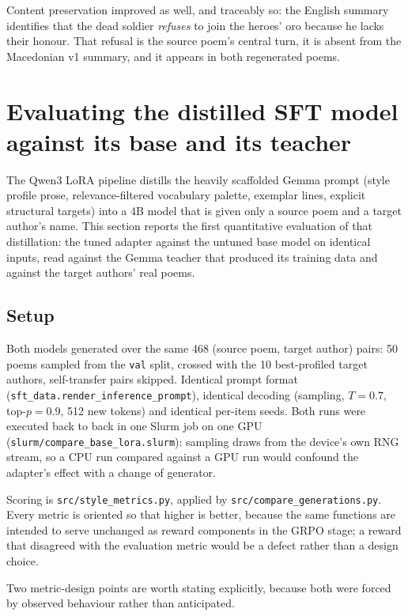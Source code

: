 \documentclass[11pt]{article}
\begin{document}
Content preservation improved as well, and traceably so: the English summary
identifies that the dead soldier \emph{refuses} to join the heroes' oro because
he lacks their honour. That refusal is the source poem's central turn, it is
absent from the Macedonian v1 summary, and it appears in both regenerated
poems.

\section{Evaluating the distilled SFT model against its base and its
teacher}\label{sec:sfteval}

The Qwen3 LoRA pipeline distills the heavily scaffolded Gemma prompt (style
profile prose, relevance-filtered vocabulary palette, exemplar lines,
explicit structural targets) into a 4B model that is given only a source poem
and a target author's name. This section reports the first quantitative
evaluation of that distillation: the tuned adapter against the untuned base
model on identical inputs, read against the Gemma teacher that produced its
training data and against the target authors' real poems.

\subsection{Setup}

Both models generated over the same 468 (source poem, target author) pairs:
50 poems sampled from the \texttt{val} split, crossed with the 10
best-profiled target authors, self-transfer pairs skipped. Identical prompt
format (\texttt{sft\_data.render\_inference\_prompt}), identical decoding
(sampling, $T=0.7$, top-$p=0.9$, 512 new tokens) and identical per-item seeds.
Both runs were executed back to back in one Slurm job on one GPU
(\texttt{slurm/compare\_base\_lora.slurm}): sampling draws from the device's
own RNG stream, so a CPU run compared against a GPU run would confound the
adapter's effect with a change of generator.

Scoring is \texttt{src/style\_metrics.py}, applied by
\texttt{src/compare\_generations.py}. Every metric is oriented so that higher
is better, because the same functions are intended to serve unchanged as
reward components in the GRPO stage; a reward that disagreed with the
evaluation metric would be a defect rather than a design choice.

Two metric-design points are worth stating explicitly, because both were
forced by observed behaviour rather than anticipated.
\end{document}
